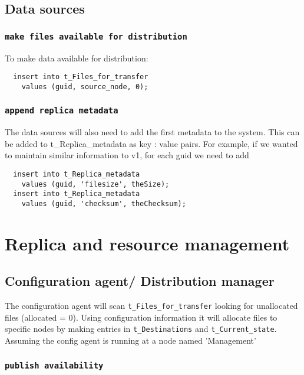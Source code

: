 \documentclass{cmspaper}
\begin{document}
\subsection{Data sources}

\subsubsection{\textbf{\texttt{make files available for distribution}}}
To make data available for distribution:

{\small\begin{verbatim}
  insert into t_Files_for_transfer
    values (guid, source_node, 0);
\end{verbatim}}

\subsubsection{\textbf{\texttt{append replica metadata}}}
The data sources will also need to add the first metadata to the system. This can be added to t\_Replica\_metadata as key : value pairs. For example, if we wanted to maintain similar information to v1, for each guid we need to add

{\small\begin{verbatim}
  insert into t_Replica_metadata
    values (guid, 'filesize', theSize);
  insert into t_Replica_metadata
    values (guid, 'checksum', theChecksum);
\end{verbatim}}

\section{Replica and resource management}
\subsection{Configuration agent/ Distribution manager}

The configuration agent will scan \texttt{t\_Files\_for\_transfer}
looking for unallocated files (allocated = 0).  Using configuration
information it will allocate files to specific nodes by making entries
in \texttt{t\_Destinations} and \texttt{t\_Current\_state}. Assuming the config agent is running at a node named 'Management'

\subsubsection{\textbf{\texttt{publish availability}}}
\end{document}
